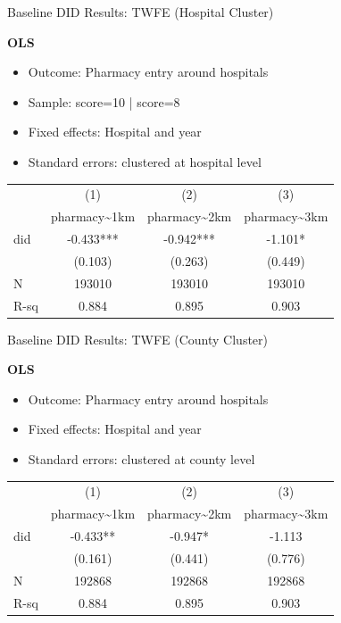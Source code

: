 \documentclass{beamer}
\begin{document}
\begin{frame}{Baseline DID Results: TWFE (Hospital Cluster)}

\textbf{OLS}

\begin{itemize}
    \item Outcome: Pharmacy entry around hospitals 
    \item Sample: score=10 | score=8
    \item Fixed effects: Hospital and year
    \item Standard errors: clustered at hospital level
\end{itemize}

\vspace{0.5em}
\centering
\footnotesize
\begin{tabular}{lccc}
\toprule
 & (1) & (2) & (3) \\
 & pharmacy\textasciitilde 1km & pharmacy\textasciitilde 2km & pharmacy\textasciitilde 3km \\
\midrule
did & -0.433*** & -0.942*** & -1.101* \\
 & (0.103) & (0.263) & (0.449) \\
\midrule
N & 193010 & 193010 & 193010 \\
R-sq & 0.884 & 0.895 & 0.903 \\
\bottomrule
\end{tabular}

\end{frame}

\begin{frame}{Baseline DID Results: TWFE (County Cluster)}

\textbf{OLS}

\begin{itemize}
    \item Outcome: Pharmacy entry around hospitals 
    \item Fixed effects: Hospital and year
    \item Standard errors: clustered at county level  
\end{itemize}

\vspace{0.5em}
\centering
\footnotesize
\begin{tabular}{lccc}
\toprule
 & (1) & (2) & (3) \\
 & pharmacy\textasciitilde 1km & pharmacy\textasciitilde 2km & pharmacy\textasciitilde 3km \\
\midrule
did & -0.433** & -0.947* & -1.113 \\
 & (0.161) & (0.441) & (0.776) \\
\midrule
N & 192868 & 192868 & 192868 \\
R-sq & 0.884 & 0.895 & 0.903 \\
\bottomrule
\end{tabular}
\end{frame}
\end{document}
